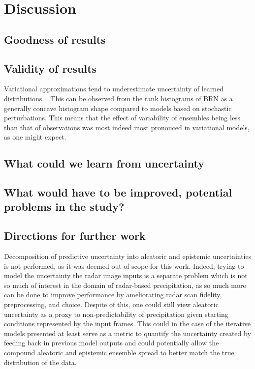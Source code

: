 \chapter{Discussion}
\label{chapter:discussion}

\section{Goodness of results}
\section{Validity of results}

Variational approximations tend to underestimate uncertainty of learned distributions. \cite{bishop2006pattern, minka_family_nodate}. This can be observed from the rank histograms of BRN as a generally concave histogram shape compared to models based on stochastic perturbations. This means that the effect of variability of ensembles being less than that of observations was most indeed most pronouced in variational models, as one might expect. 
\section{What could we learn from uncertainty}

\section{What would have to be improved, potential problems in the study?}

\section{Directions for further work}

Decomposition of predictive uncertainty into aleatoric and epistemic uncertainties is not performed, as it was deemed out of scope for this work. Indeed, trying to model the uncertainty the radar image inputs is a separate problem which is not so much of interest in the domain of radar-based precipitation, as so much more can be done to improve performance by ameliorating radar scan fidelity, preprocessing, and choice. Despite of this, one could still view aleatoric uncertainty as a proxy to non-predictability of precipitation given starting conditions represented by the input frames. This could in the case of the iterative models presented at least serve as a metric to quantify the uncertainty created by feeding back in previous model outputs and could potentially allow the compound aleatoric and epistemic ensemble spread to better match the true distribution of the data. 

